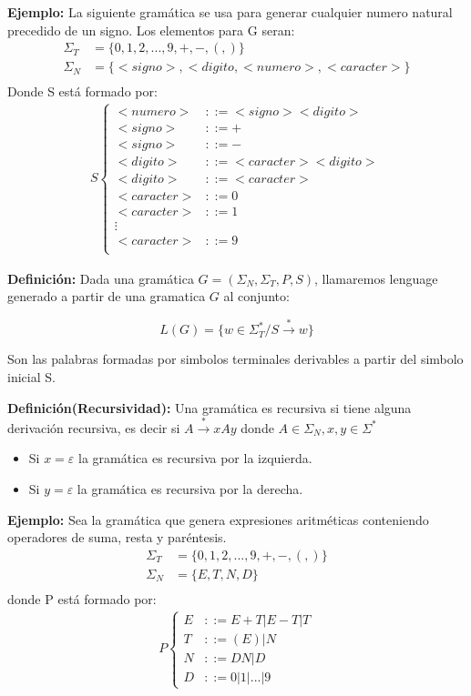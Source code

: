 \textbf{Ejemplo: }La siguiente gramática se usa para generar cualquier numero natural precedido de un signo. Los elementos para G seran:
\begin{align*}
\Sigma_T	&=\{0,1,2,...,9,+,-,(,)\}	\\
\Sigma_N	&=\{<signo>,<digito,<numero>,<caracter>\}	\\
\end{align*}
Donde S está formado por:
\begin{align*}
S\left \{\begin{array}{rl}
<numero>&::=<signo><digito>\\	
<signo>&::=+	\\
<signo>&::=-	\\
<digito>&::=<caracter><digito>	\\
<digito>&::=<caracter>	\\
<caracter>&::=0	\\
<caracter>&::=1	\\
 \vdots & \\
<caracter>&::=9	\\
\end{array}\right.
\end{align*}


\textbf{Definición:} Dada una gramática $G=(\Sigma_N,\Sigma_T,P,S)$, llamaremos lenguage generado a partir de una gramatica $G$ al conjunto:

$$
L(G)=\{w \in \Sigma_{T}^{*}/S\xrightarrow{*} w\}
$$

Son las palabras formadas por simbolos terminales derivables a partir del simbolo inicial S.

\textbf{Definición(Recursividad): }Una gramática es recursiva si tiene alguna derivación recursiva, es decir si $A\xrightarrow{*}xAy$ donde $A\in \Sigma_N, x,y\in \Sigma^*$
\begin{itemize}
\item Si $x=\varepsilon$ la gramática es recursiva por la izquierda.
\item Si $y=\varepsilon$ la gramática es recursiva por la derecha.
\end{itemize}

\textbf{Ejemplo: }Sea la gramática que genera expresiones aritméticas conteniendo operadores de suma, resta y paréntesis.
\begin{align*}
\Sigma_T	&=\{0,1,2,...,9,+,-,(,)\}	\\
\Sigma_N	&=\{E,T,N,D\}	\\
\end{align*}
donde P está formado por:
\begin{align*}
P\left \{\begin{array}{rl}
E	&::=E+T|E-T|T\\	
T	&::=(E)|N	\\
N	&::=DN|D	\\
D	&::=0|1|...|9	
\end{array}\right.
\end{align*}

